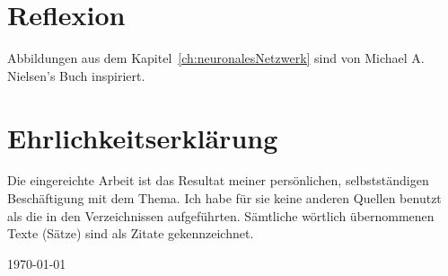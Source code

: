 \documentclass[12pt,a4paper]{report}
\begin{document}
\chapter{Reflexion}
\label{ch:reflexion}


\clearpage
{}
{}
\nocite{*}



\clearpage
{}
{}
\listoffigures
Abbildungen aus dem Kapitel~\ref{ch:neuronalesNetzwerk} sind von Michael A. Nielsen's Buch\cite{neuralbook} inspiriert.

\appendix


\chapter*{Ehrlichkeitserklärung}

Die eingereichte Arbeit ist das Resultat meiner persönlichen, selbstständigen Beschäftigung mit dem Thema.
Ich habe für sie keine anderen Quellen benutzt als die in den Verzeichnissen aufgeführten.
Sämtliche wörtlich übernommenen Texte (Sätze) sind als Zitate gekennzeichnet.

\vspace{2cm}
\today
\end{document}
